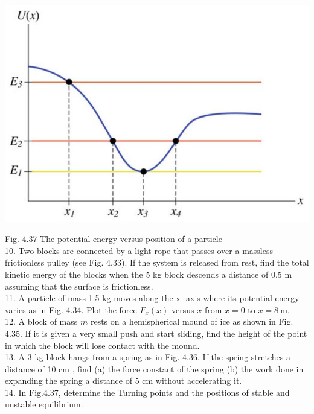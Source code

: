 \documentclass[10pt]{article}
\begin{document}
\begin{center}
\includegraphics[max width=\textwidth]{2024_09_13_db1f357d2aad0a03eb2eg-080(3)}
\end{center}

Fig. 4.37 The potential energy versus position of a particle\\
10. Two blocks are connected by a light rope that passes over a massless frictionless pulley (see Fig. 4.33). If the system is released from rest, find the total kinetic energy of the blocks when the 5 kg block descends a distance of 0.5 m assuming that the surface is frictionless.\\
11. A particle of mass 1.5 kg moves along the x -axis where its potential energy varies as in Fig. 4.34. Plot the force $F_{x}(x)$ versus $x$ from $x=0$ to $x=8 \mathrm{~m}$.\\
12. A block of mass $m$ rests on a hemispherical mound of ice as shown in Fig. 4.35. If it is given a very small push and start sliding, find the height of the point in which the block will lose contact with the mound.\\
13. A 3 kg block hangs from a spring as in Fig. 4.36. If the spring stretches a distance of 10 cm , find (a) the force constant of the spring (b) the work done in expanding the spring a distance of 5 cm without accelerating it.\\
14. In Fig.4.37, determine the Turning points and the positions of stable and unstable equilibrium.
\end{document}
